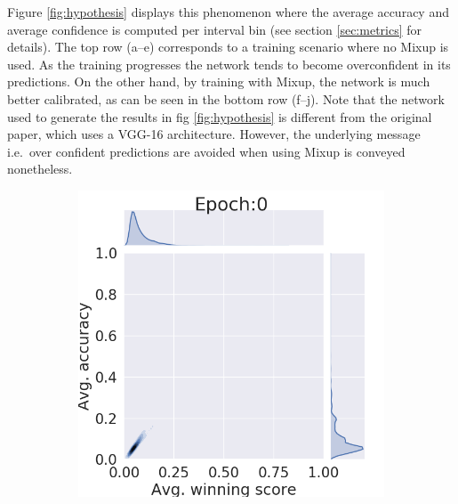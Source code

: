 Figure \ref{fig:hypothesis} displays this phenomenon where the average accuracy and average confidence is computed per interval bin (see section \ref{sec:metrics} for details). The top row (a--e) corresponds to a training scenario where no Mixup is used. As the training progresses the network tends to become overconfident in its predictions. %
On the other hand, by training with Mixup, the network is much better calibrated, as can be seen in the bottom row (f--j). Note that the network used to generate the results in fig \ref{fig:hypothesis} is different from the original paper, which uses a VGG-16 architecture. However, the underlying message i.e.\ over confident predictions are avoided when using Mixup is conveyed nonetheless.  
\begin{figure}[htb]
     \centering
     \begin{subfigure}[b]{0.19\textwidth}
         \centering
         \noindent\includegraphics[width=\textwidth]{images/joint_plot/no_mixup/0.png}
         \caption{}
     \end{subfigure}
     \hfill
     \begin{subfigure}[b]{0.19\textwidth}
         \centering

\end{subfigure}
\end{figure}
